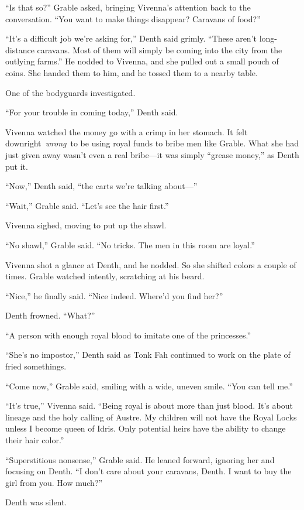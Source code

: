 “Is that so?” Grable asked, bringing Vivenna’s attention back to the conversation. “You want to make things disappear? Caravans of food?”

“It’s a difficult job we’re asking for,” Denth said grimly. “These aren’t long-distance caravans. Most of them will simply be coming into the city from the outlying farms.” He nodded to Vivenna, and she pulled out a small pouch of coins. She handed them to him, and he tossed them to a nearby table.

One of the bodyguards investigated.

“For your trouble in coming today,” Denth said.

Vivenna watched the money go with a crimp in her stomach. It felt downright~\textit{wrong}~to be using royal funds to bribe men like Grable. What she had just given away wasn’t even a real bribe—it was simply “grease money,” as Denth put it.

“Now,” Denth said, “the carts we’re talking about—”

“Wait,” Grable said. “Let’s see the hair first.”

Vivenna sighed, moving to put up the shawl.

“No shawl,” Grable said. “No tricks. The men in this room are loyal.”

Vivenna shot a glance at Denth, and he nodded. So she shifted colors a couple of times. Grable watched intently, scratching at his beard.

“Nice,” he finally said. “Nice indeed. Where’d you find her?”

Denth frowned. “What?”

“A person with enough royal blood to imitate one of the princesses.”

“She’s no impostor,” Denth said as Tonk Fah continued to work on the plate of fried somethings.

“Come now,” Grable said, smiling with a wide, uneven smile. “You can tell me.”

“It’s true,” Vivenna said. “Being royal is about more than just blood. It’s about lineage and the holy calling of Austre. My children will not have the Royal Locks unless I become queen of Idris. Only potential heirs have the ability to change their hair color.”

“Superstitious nonsense,” Grable said. He leaned forward, ignoring her and focusing on Denth. “I don’t care about your caravans, Denth. I want to buy the girl from you. How much?”

Denth was silent.

